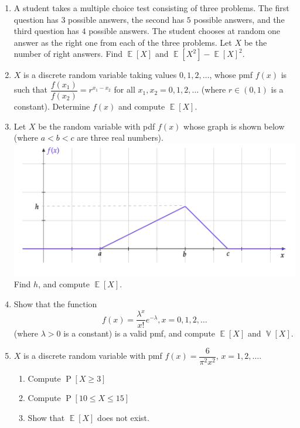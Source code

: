 \documentclass[svgnames]{amsart}
\DeclareMathOperator{\Prob}{P}
\DeclareMathOperator{\EV}{\mathbb E}
\DeclareMathOperator{\Var}{\mathbb V}
\begin{document}
\begin{enumerate}[leftmargin=*, itemsep=0.3em]
\item A student takes a multiple choice test consisting of three problems. The first question has $3$ possible answers, the second has $5$ possible answers, and the third question has $4$ possible answers. The student chooses at random one answer as the right one from each of the three problems. Let $X$ be the number of right answers. Find $\EV[X]$ and $\EV[X^2] - \EV[X]^2$.

\item $X$ is a discrete random variable taking values $0, 1, 2, \ldots$, whose pmf $f(x)$ is such that $\dfrac{f(x_1)}{f(x_2)} = r^{x_1 - x_2}$ for all $x_1, x_2 = 0, 1, 2, \ldots$ (where $r \in (0, 1)$ is a constant). Determine $f(x)$ and compute $\EV[X]$.

\item Let $X$ be the random variable with pdf $f(x)$ whose graph is shown below (where $a < b < c$ are three real numbers).\\
\includegraphics[scale=0.6]{Set3Graph.pdf} \\
Find $h$, and compute $\EV[X]$.

\item Show that the function
\begin{equation*}
f(x) = \dfrac{\lambda^x}{x!}e^{-\lambda}, x = 0, 1, 2, \ldots
\end{equation*}
(where $\lambda > 0$ is a constant) is a valid pmf, and compute $\EV[X]$ and $\Var[X]$.

\item $X$ is a discrete random variable with pmf $f(x) = \dfrac{6}{\pi^2 x^2}$, $x = 1, 2, \ldots$.
\begin{enumerate}
	\item Compute $\Prob[X \ge 3]$
	\item Compute $\Prob[10 \le X \le 15]$
	\item Show that $\EV[X]$ does not exist.
\end{enumerate}


\end{enumerate}
\end{document}
